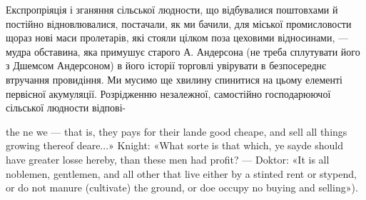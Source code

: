 Експропріяція і зганяння сільської людности, що відбувалися
поштовхами й постійно відновлювалися, постачали, як ми бачили,
для міської промисловости щораз нові маси пролетарів, які
стояли цілком поза цеховими відносинами, — мудра обставина,
яка примушує старого А. Андерсона (не треба сплутувати його
з Дшемсом Андерсоном) в його історії торговлі увірувати в безпосереднє
втручання провидіння. Ми мусимо ще хвилину спинитися
на цьому елементі первісної акумуляції. Розрідженню незалежної,
самостійно господарюючої сільської людности відпові-

the ne we — that is, they pays for their lande good cheape, and sell all things
growing thereof deare...» Knight: «What sorte is that which, ye sayde
should have greater losse hereby, than these men had profit? — Doktor:
«It is all noblemen, gentlemen, and all other that live either by a stinted
rent or stypend, or do not manure (cultivate) the ground, or doe occupy no
buying and selling»).